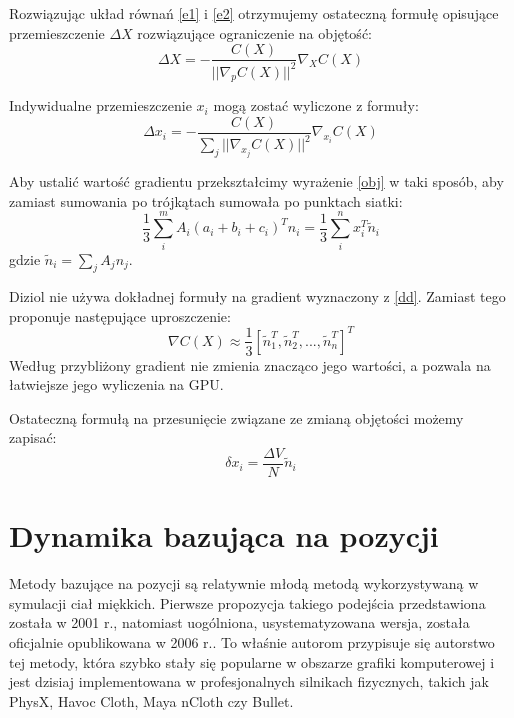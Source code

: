 Rozwiązując układ równań \ref{e1} i \ref{e2} otrzymujemy ostateczną formułę
opisujące przemieszczenie $\Delta X$ rozwiązujące ograniczenie na objętość:
\begin{equation*}
\Delta X = - \frac{C(X)}{||\nabla_p C(X)||^2} \nabla_X C(X)
\end{equation*}

Indywidualne przemieszczenie $x_i$ mogą zostać wyliczone z formuły:
\begin{equation}
\Delta x_i = - \frac{C(X)}{\sum_j ||\nabla_{x_j} C(X)||^2} \nabla_{x_i} C(X)
\end{equation}

Aby ustalić wartość gradientu przekształcimy wyrażenie \ref{obj} w taki sposób,
	aby zamiast sumowania po trójkątach sumowała po punktach siatki:
\begin{equation}
\label{dd}
\frac{1}{3} \sum_i^m A_i (a_i + b_i + c_i)^T n_i = \frac{1}{3} \sum_i^n x_i^T
\tilde{n}_i
\end{equation}
gdzie $\tilde{n}_i = \sum_j A_j n_j$.

Diziol \cite{diziol} nie używa dokładnej formuły na gradient wyznaczony z
\ref{dd}. Zamiast tego proponuje następujące uproszczenie:
\begin{equation}
\nabla C(X) \approx \frac{1}{3} [\tilde{n}^T_1, \tilde{n}^T_2, ...,
	\tilde{n}^T_n]^T
\end{equation}
Według \cite{diziol} przybliżony gradient nie zmienia znacząco jego wartości, a
pozwala na łatwiejsze jego wyliczenia na GPU.

Ostateczną formułą na przesunięcie związane ze zmianą objętości możemy zapisać:
\begin{equation}
\delta x_i = \frac{\Delta V}{N} \tilde{n}_i
\end{equation}



\section{Dynamika bazująca na pozycji}

Metody bazujące na pozycji są relatywnie młodą metodą wykorzystywaną w symulacji
ciał miękkich. Pierwsze propozycja takiego podejścia przedstawiona została w
2001 r.\cite{jak}, natomiast uogólniona, usystematyzowana wersja, została oficjalnie
opublikowana w 2006 r.\cite{pbdyn}. To właśnie autorom \cite{pbdyn} przypisuje
się autorstwo tej metody, która szybko stały się popularne w obszarze grafiki
komputerowej i jest dzisiaj implementowana w profesjonalnych silnikach fizycznych,
takich jak PhysX, Havoc Cloth, Maya nCloth czy Bullet.

